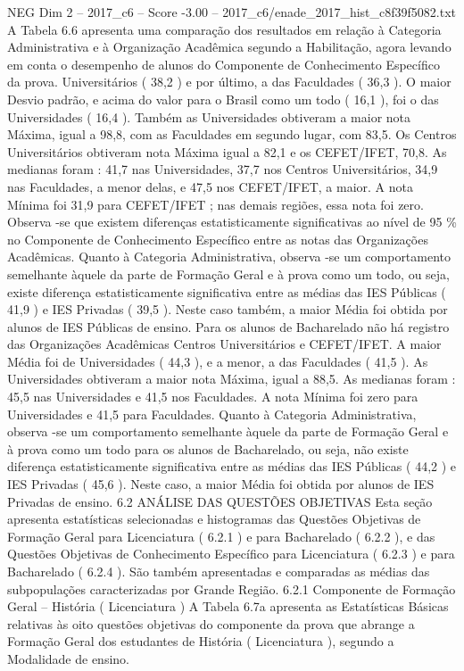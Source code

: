 \begin{textsample}{NEG Dim 2 – 2017\_c6 – Score -3.00 – 2017\_c6/enade\_2017\_hist\_c8f39f5082.txt}
A Tabela 6.6 apresenta uma comparação dos resultados em relação à Categoria Administrativa e à Organização Acadêmica segundo a Habilitação, agora levando em conta o desempenho de alunos do Componente de Conhecimento Específico da prova.
Universitários ( 38,2 ) e por último, a das Faculdades ( 36,3 ).
O maior Desvio padrão, e acima do valor para o Brasil como um todo ( 16,1 ), foi o das Universidades ( 16,4 ).
Também as Universidades obtiveram a maior nota Máxima, igual a 98,8, com as Faculdades em segundo lugar, com 83,5.
Os Centros Universitários obtiveram nota Máxima igual a 82,1 e os CEFET/IFET, 70,8.
As medianas foram : 41,7 nas Universidades, 37,7 nos Centros Universitários, 34,9 nas Faculdades, a menor delas, e 47,5 nos CEFET/IFET, a maior.
A nota Mínima foi 31,9 para CEFET/IFET ; nas demais regiões, essa nota foi zero.
Observa -se que existem diferenças estatisticamente significativas ao nível de 95 \% no Componente de Conhecimento Específico entre as notas das Organizações Acadêmicas.
Quanto à Categoria Administrativa, observa -se um comportamento semelhante àquele da parte de Formação Geral e à prova como um todo, ou seja, existe diferença estatisticamente significativa entre as médias das IES Públicas ( 41,9 ) e IES Privadas ( 39,5 ).
Neste caso também, a maior Média foi obtida por alunos de IES Públicas de ensino.
Para os alunos de Bacharelado não há registro das Organizações Acadêmicas Centros Universitários e CEFET/IFET.
A maior Média foi de Universidades ( 44,3 ), e a menor, a das Faculdades ( 41,5 ).
As Universidades obtiveram a maior nota Máxima, igual a 88,5.
As medianas foram : 45,5 nas Universidades e 41,5 nos Faculdades.
A nota Mínima foi zero para Universidades e 41,5 para Faculdades.
Quanto à Categoria Administrativa, observa -se um comportamento semelhante àquele da parte de Formação Geral e à prova como um todo para os alunos de Bacharelado, ou seja, não existe diferença estatisticamente significativa entre as médias das IES Públicas ( 44,2 ) e IES Privadas ( 45,6 ).
Neste caso, a maior Média foi obtida por alunos de IES Privadas de ensino. 6.2 ANÁLISE DAS QUESTÕES OBJETIVAS Esta seção apresenta estatísticas selecionadas e histogramas das Questões Objetivas de Formação Geral para Licenciatura ( 6.2.1 ) e para Bacharelado ( 6.2.2 ), e das Questões Objetivas de Conhecimento Específico para Licenciatura ( 6.2.3 ) e para Bacharelado ( 6.2.4 ).
São também apresentadas e comparadas as médias das subpopulações caracterizadas por Grande Região. 6.2.1 Componente de Formação Geral – História ( Licenciatura ) A Tabela 6.7a apresenta as Estatísticas Básicas relativas às oito questões objetivas do componente da prova que abrange a Formação Geral dos estudantes de História ( Licenciatura ), segundo a Modalidade de ensino.

\end{textsample}
